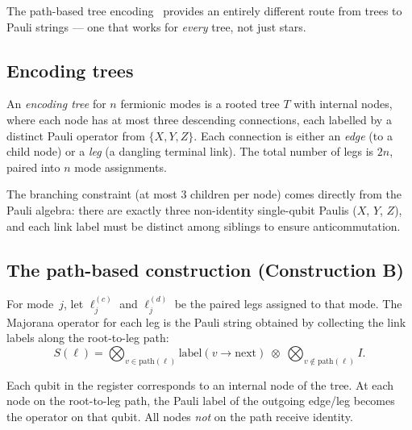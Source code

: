 %

The path-based tree encoding~\cite{jiang2020, miller2023bonsai}
provides an entirely different route from trees to Pauli strings ---
one that works for \emph{every} tree, not just stars.

\subsection{Encoding trees}
\label{sec:encoding-trees}

\begin{definition}
\label{def:encoding-tree}
An \emph{encoding tree} for $n$ fermionic modes is a rooted tree $T$
with internal nodes, where each node has at most three descending
connections, each labelled by a distinct Pauli operator from $\{X, Y,
Z\}$.  Each connection is either an \emph{edge} (to a child node) or a
\emph{leg} (a dangling terminal link).  The total number of legs is
$2n$, paired into $n$ mode assignments.
\end{definition}

The branching constraint (at most 3 children per node) comes directly
from the Pauli algebra: there are exactly three non-identity
single-qubit Paulis ($X$, $Y$, $Z$), and each link label must be
distinct among siblings to ensure anticommutation.

\subsection{The path-based construction (Construction B)}
\label{sec:construction-b}

For mode~$j$, let $\ell_j^{(c)}$ and $\ell_j^{(d)}$ be the paired
legs assigned to that mode.  The Majorana operator for each leg is the
Pauli string obtained by collecting the link labels along the
root-to-leg path:
\begin{equation}
  S(\ell) = \bigotimes_{v \in \mathrm{path}(\ell)}
    \text{label}(v \to \text{next}) \;\otimes\;
    \bigotimes_{v \notin \mathrm{path}(\ell)} I.
  \label{eq:path-pauli}
\end{equation}

Each qubit in the register corresponds to an internal node of the
tree.  At each node on the root-to-leg path, the Pauli label of the
outgoing edge/leg becomes the operator on that qubit.  All nodes
\emph{not} on the path receive identity.


